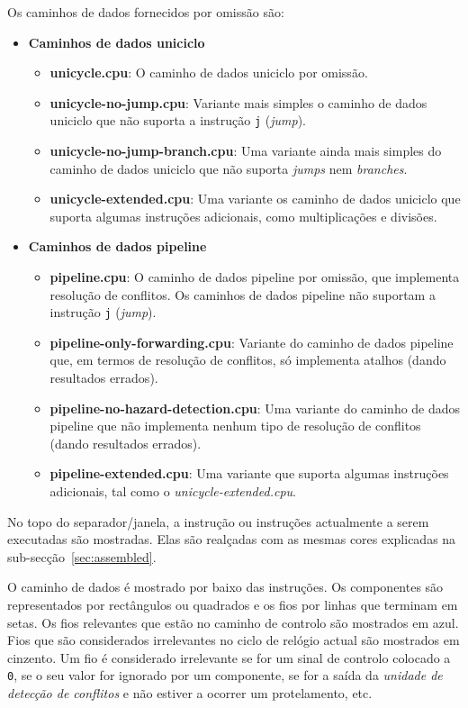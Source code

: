 \documentclass[11pt,a4paper,twoside,titlepage]{article}
\begin{document}
Os caminhos de dados fornecidos por omissão são:
\begin{itemize}
	\item \textbf{Caminhos de dados uniciclo}
	\begin{itemize}
		\item \textbf{unicycle.cpu}: O caminho de dados uniciclo por omissão.
		\item \textbf{unicycle-no-jump.cpu}: Variante mais simples o caminho
			de dados uniciclo que não suporta a instrução \verb+j+
			(\emph{jump}).
		\item \textbf{unicycle-no-jump-branch.cpu}: Uma variante ainda mais
			simples do caminho de dados uniciclo que não suporta \emph{jumps}
			nem \emph{branches}.
		\item \textbf{unicycle-extended.cpu}: Uma variante os caminho de dados
			uniciclo que suporta algumas instruções adicionais, como
			multiplicações e divisões.
	\end{itemize}
	
	\item \textbf{Caminhos de dados pipeline}
	\begin{itemize}
		\item \textbf{pipeline.cpu}: O caminho de dados pipeline por omissão,
			que implementa resolução de conflitos. Os caminhos de dados 
			pipeline não suportam a instrução \verb+j+ (\emph{jump}).
		\item \textbf{pipeline-only-forwarding.cpu}: Variante do caminho de 
			dados pipeline que, em termos de resolução de conflitos, só
			implementa atalhos (dando resultados errados).
		\item \textbf{pipeline-no-hazard-detection.cpu}: Uma variante do
			caminho de dados pipeline que não implementa nenhum tipo de
			resolução de conflitos (dando resultados errados).
		\item \textbf{pipeline-extended.cpu}: Uma variante que suporta algumas
			instruções adicionais, tal como o \emph{unicycle-extended.cpu}.
	\end{itemize}
\end{itemize}

No topo do separador/janela, a instrução ou instruções actualmente a serem
executadas são mostradas. Elas são realçadas com as mesmas cores explicadas
na sub-secção~\ref{sec:assembled}.

O caminho de dados é mostrado por baixo das instruções.
Os componentes são representados por rectângulos ou quadrados e os fios por
linhas que terminam em setas.
Os fios relevantes que estão no caminho de controlo são mostrados em azul.
Fios que são considerados irrelevantes no ciclo de relógio actual são 
mostrados em cinzento.
Um fio é considerado irrelevante se for um sinal de controlo colocado a
\verb+0+, se o seu valor for ignorado por um componente, se for a saída da
\emph{unidade de detecção de conflitos} e não estiver a ocorrer um
protelamento, etc.
\end{document}
